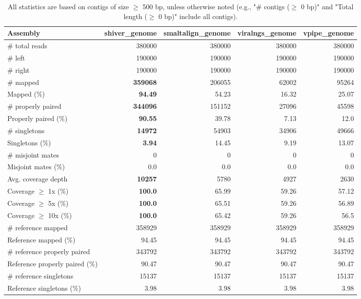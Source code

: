\documentclass[12pt,a4paper]{article}
\begin{document}
\begin{table}[ht]
\begin{center}
\caption{All statistics are based on contigs of size $\geq$ 500 bp, unless otherwise noted (e.g., "\# contigs ($\geq$ 0 bp)" and "Total length ($\geq$ 0 bp)" include all contigs).}
\begin{tabular}{|l*{4}{|r}|}
\hline
Assembly & shiver\_genome & smaltalign\_genome & viralngs\_genome & vpipe\_genome \\ \hline
\# total reads & 380000 & 380000 & 380000 & 380000 \\ \hline
\# left & 190000 & 190000 & 190000 & 190000 \\ \hline
\# right & 190000 & 190000 & 190000 & 190000 \\ \hline
\# mapped & {\bf 359068} & 206055 & 62002 & 95264 \\ \hline
Mapped (\%) & {\bf 94.49} & 54.23 & 16.32 & 25.07 \\ \hline
\# properly paired & {\bf 344096} & 151152 & 27096 & 45598 \\ \hline
Properly paired (\%) & {\bf 90.55} & 39.78 & 7.13 & 12.0 \\ \hline
\# singletons & {\bf 14972} & 54903 & 34906 & 49666 \\ \hline
Singletons (\%) & {\bf 3.94} & 14.45 & 9.19 & 13.07 \\ \hline
\# misjoint mates & 0 & 0 & 0 & 0 \\ \hline
Misjoint mates (\%) & 0.0 & 0.0 & 0.0 & 0.0 \\ \hline
Avg. coverage depth & {\bf 10257} & 5780 & 4927 & 2630 \\ \hline
Coverage $\geq$ 1x (\%) & {\bf 100.0} & 65.99 & 59.26 & 57.12 \\ \hline
Coverage $\geq$ 5x (\%) & {\bf 100.0} & 65.51 & 59.26 & 56.89 \\ \hline
Coverage $\geq$ 10x (\%) & {\bf 100.0} & 65.42 & 59.26 & 56.5 \\ \hline
\# reference mapped & 358929 & 358929 & 358929 & 358929 \\ \hline
Reference mapped (\%) & 94.45 & 94.45 & 94.45 & 94.45 \\ \hline
\# reference properly paired & 343792 & 343792 & 343792 & 343792 \\ \hline
Reference properly paired (\%) & 90.47 & 90.47 & 90.47 & 90.47 \\ \hline
\# reference singletons & 15137 & 15137 & 15137 & 15137 \\ \hline
Reference singletons (\%) & 3.98 & 3.98 & 3.98 & 3.98 \\ \hline

\end{tabular}
\end{center}
\end{table}
\end{document}
